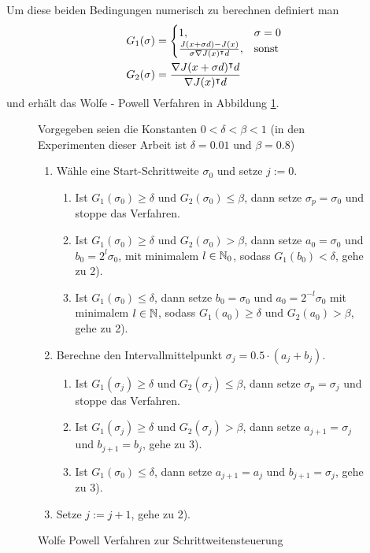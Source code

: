 Um diese beiden Bedingungen numerisch zu berechnen definiert man
\begin{equation}
\begin{aligned}
 G_1(\sigma)&=
 \begin{cases}
 1,& \sigma=0\\
 \frac{J(x+\sigma d)-J(x)}{\sigma \nabla J(x)^\intercal d}, & \text{sonst}
 \end{cases} \\
 G_2(\sigma) &= \frac{\nabla J(x+\sigma d)^\intercal d}{\nabla J(x)^\intercal d}
 \end{aligned}
\end{equation}
und erhält das Wolfe - Powell Verfahren in Abbildung \ref{alg:wolfePowell}.

\begin{figure}[ht]
\begin{framed}
Vorgegeben seien die Konstanten $0<\delta<\beta<1$ (in den Experimenten dieser Arbeit ist $\delta = 0.01$ und $\beta = 0.8$)
 \begin{enumerate}
  \item Wähle eine Start-Schrittweite $\sigma_0$ und setze $j:=0$.
  \begin{enumerate}
   \item Ist $G_1(\sigma_0)\geq \delta$ und $G_2(\sigma_0)\leq \beta$, dann setze $\sigma_p=\sigma_0$ und stoppe das Verfahren.
   \item Ist $G_1(\sigma_0)\geq \delta$ und $G_2(\sigma_0)> \beta$, dann setze $a_0=\sigma_0$ und $b_0=2^l\sigma_0$, mit minimalem $l\in \mathbb{N}_0$, sodass $G_1(b_0)<\delta$, gehe zu 2).
   \item Ist $G_1(\sigma_0)\leq \delta$, dann setze $b_0=\sigma_0$ und $a_0=2^{-l}\sigma_0$ mit minimalem $l\in \mathbb{N}$, sodass $G_1(a_0)\geq\delta$ und $G_2(a_0)>\beta$, gehe zu 2).
  \end{enumerate}
  \item Berechne den Intervallmittelpunkt $\sigma_j = 0.5\cdot (a_j+b_j)$.
  \begin{enumerate}
    \item Ist $G_1(\sigma_j)\geq \delta$ und $G_2(\sigma_j)\leq \beta$, dann setze $\sigma_p=\sigma_j$ und stoppe das Verfahren.
    \item Ist $G_1(\sigma_j)\geq \delta$ und $G_2(\sigma_j)> \beta$, dann setze $a_{j+1}=\sigma_j$ und $b_{j+1}=b_j$, gehe zu 3).
    \item Ist $G_1(\sigma_0)\leq \delta$, dann setze $a_{j+1}=a_j$ und $b_{j+1}=\sigma_j$, gehe zu 3).
  \end{enumerate}
  \item Setze $j:=j+1$, gehe zu 2).
 \end{enumerate}
\end{framed}
\caption{Wolfe Powell Verfahren zur Schrittweitensteuerung}
\label{alg:wolfePowell}
\end{figure}

